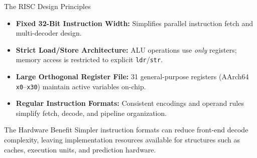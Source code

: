 \documentclass[aspectratio=169,11pt,t]{beamer}
\newcommand{\key}[1]{\textbf{#1}}
\newcommand{\bits}[1]{\texttt{#1}}
\newcommand{\code}[1]{\texttt{#1}}
\begin{document}
\begin{frame}{The RISC Design Principles}
\vfill
\begin{itemize}\setlength{\itemsep}{7pt}
  \item \key{Fixed 32-Bit Instruction Width:} Simplifies parallel instruction fetch and multi-decoder design.
  \item \key{Strict Load/Store Architecture:} ALU operations use \emph{only} registers; memory access is restricted to explicit \code{ldr}/\code{str}.
  \item \key{Large Orthogonal Register File:} 31 general-purpose registers (AArch64 \bits{x0}--\bits{x30}) maintain active variables on-chip.
  \item \key{Regular Instruction Formats:} Consistent encodings and operand rules simplify fetch, decode, and pipeline organization.
\end{itemize}

\vfill
\begin{block}{The Hardware Benefit}
\small Simpler instruction formats can reduce front-end decode complexity, leaving implementation resources available for structures such as caches, execution units, and prediction hardware.
\end{block}
\vfill
\end{frame}











\end{document}
